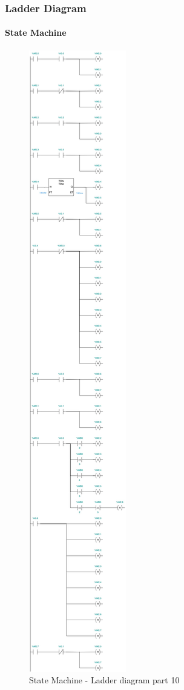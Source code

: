 \documentclass[12pt]{beamer}
\begin{document}
\begin{frame}
\frametitle{Ladder Diagram}
\framesubtitle{State Machine}
\begin{figure}
    \centering
    \includegraphics[trim={0 0 0 99cm}, clip, scale=.5]{img/Ladder_diagram_2.jpg}
    \caption{State Machine - Ladder diagram part 10}
    \label{fig:ladder210}
\end{figure}
\end{frame}
\end{document}
